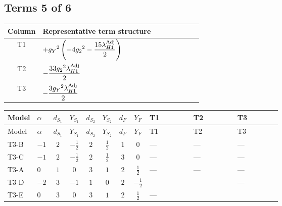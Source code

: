 \documentclass[8pt]{article}
\begin{document}
\begin{landscape}
\subsection*{Terms 5 of 6}
\begin{center}
\begin{tabular}{@{}c >{\raggedright\arraybackslash}p{0.82\linewidth}@{}}
\toprule
Column & Representative term structure \\
\midrule
T1 & \(\displaystyle +{g_Y}^2 \left(-4 {g_2}^2-\frac{15 {\lambda_{H1}^{\rm Adj}}}{2}\right)\) \\
\midrule
T2 & \(\displaystyle -\frac{33 {g_2}^2 {\lambda_{H1}^{\rm Adj}}}{2}\) \\
\midrule
T3 & \(\displaystyle -\frac{3 {g_Y}^2 {\lambda_{H1}^{\rm Adj}}}{2}\) \\
\midrule
\bottomrule
\end{tabular}
\end{center}
\smallskip
\tiny
\begin{longtable}{@{}llcccccc >{\raggedright\arraybackslash}p{0.21\linewidth} >{\raggedright\arraybackslash}p{0.21\linewidth} >{\raggedright\arraybackslash}p{0.21\linewidth}@{}}
\toprule
Model & $\alpha$ & $d_{S_1}$ & $Y_{S_1}$ & $d_{S_2}$ & $Y_{S_2}$ & $d_F$ & $Y_F$ & T1 & T2 & T3 \\
\midrule
\endfirsthead
\toprule
Model & $\alpha$ & $d_{S_1}$ & $Y_{S_1}$ & $d_{S_2}$ & $Y_{S_2}$ & $d_F$ & $Y_F$ & T1 & T2 & T3 \\
\midrule
\endhead
T3-B & $-1$ & $2$ & $-\frac{1}{2}$ & $2$ & $\frac{1}{2}$ & $1$ & $0$ & --- & --- & --- \\
\midrule
T3-C & $-1$ & $2$ & $-\frac{1}{2}$ & $2$ & $\frac{1}{2}$ & $3$ & $0$ & --- & --- & --- \\
\midrule
T3-A & $0$ & $1$ & $0$ & $3$ & $1$ & $2$ & $\frac{1}{2}$ & --- & --- & --- \\
\midrule
T3-D & $-2$ & $3$ & $-1$ & $1$ & $0$ & $2$ & $-\frac{1}{2}$ & \scriptsize\adjustbox{max width=\linewidth}{$\begin{gathered} +{g_Y}^2 \left(-4 {g_2}^2-\frac{15 {\lambda_{H1}^{\rm Adj}}}{2}\right)\end{gathered}$} & \scriptsize\adjustbox{max width=\linewidth}{$\begin{gathered} -\frac{33 {g_2}^2 {\lambda_{H1}^{\rm Adj}}}{2}\end{gathered}$} & --- \\
\midrule
T3-E & $0$ & $3$ & $0$ & $3$ & $1$ & $2$ & $\frac{1}{2}$ & --- & \scriptsize\adjustbox{max width=\linewidth}{$\begin{gathered} -\frac{33 {g_2}^2 {\lambda_{H1}^{\rm Adj}}}{2}\end{gathered}$} & \scriptsize\adjustbox{max width=\linewidth}{$\begin{gathered} -\frac{3 {g_Y}^2 {\lambda_{H1}^{\rm Adj}}}{2}\end{gathered}$} \\
\midrule
\bottomrule
\end{longtable}
\clearpage

\end{landscape}
\end{document}

